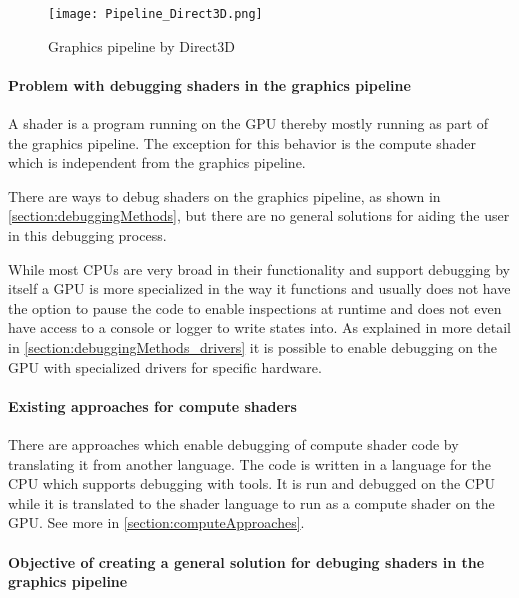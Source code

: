 \begin{figure}[h!]
  \centering 
  \texttt{[image: Pipeline\_Direct3D.png]}
  \caption[Graphics pipeline by Direct3D ]{Graphics pipeline by Direct3D}
  \label{fig:pipeline_direct3d}
\end{figure}

\paragraph{Problem with debugging shaders in the graphics pipeline}
\label{section:problems}

A shader is a program running on the GPU thereby mostly running as part of the graphics pipeline. The exception for this behavior is the compute shader which is independent from the graphics pipeline.

There are ways to debug shaders on the graphics pipeline, as shown in \autoref{section:debuggingMethods}, but there are no general solutions for aiding the user in this debugging process.

While most CPUs are very broad in their functionality and support debugging by itself a GPU is more specialized in the way it functions and usually does not have the option to pause the code to enable inspections at runtime and does not even have access to a console or logger to write states into. As explained in more detail in \autoref{section:debuggingMethods_drivers} it is possible to enable debugging on the GPU with specialized drivers for specific hardware.

\paragraph{Existing approaches for compute shaders}

There are approaches which enable debugging of compute shader code by translating it from another language. The code is written in a language for the CPU which supports debugging with tools. It is  run and debugged on the CPU while it is translated to the shader language to run as a compute shader on the GPU.
See more in \autoref{section:computeApproaches}.

\paragraph{Objective of creating a general solution for debuging shaders in the graphics pipeline}
\label{paragraph:objective}

